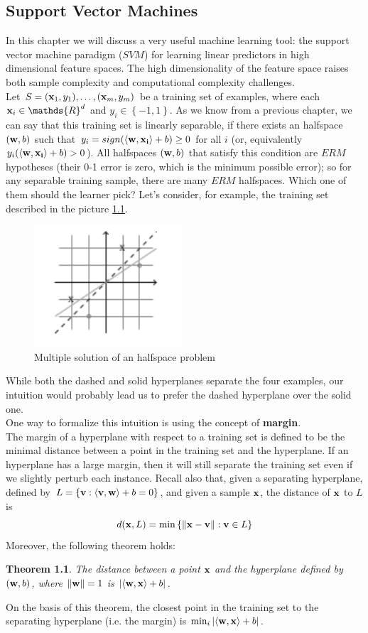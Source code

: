 \documentclass[12pt]{report}
\theoremstyle{plain}
\newtheorem{theorem}{Theorem}[chapter]
\newcommand\sprod[2]{\langle \vb{#1},\vb{#2}\rangle}
\begin{document}
\begin{flushleft}
\chapter{Support Vector Machines}
In this chapter we will discuss a very useful machine learning tool: the support vector machine paradigm ($SVM$) for learning linear predictors in high dimensional feature spaces. The high dimensionality of the feature space raises both sample complexity and computational complexity challenges.\\
Let $S=(\vb{x}_1,y_1),\dots,(\vb{x}_m,y_m)$ be a training set of examples, where each $\vb{x}_i\in\mathds{R}^d$ and $y_i\in\left\{-1,1\right\}$. As we know from a previous chapter, we can say that this training set is linearly separable, if there exists an halfspace $(\vb{w},b)$ such that $y_i = sign(\sprod{w}{x_i}+b)\geq 0$ for all $i$ (or, equivalently $y_i(\sprod{w}{x_i}+b)>0$). All halfspaces $(\vb{w},b)$ that satisfy this condition are $ERM$ hypotheses (their 0-1 error is zero, which is the minimum possible error); so for any separable training sample, there are many $ERM$ halfspaces. Which one of them should the learner pick?
Let's consider, for example, the training set described in the picture \ref{fig:ex_margin}.\\
\begin{figure}[!h]
	\centering
	\includegraphics[scale=1]{images/ex_margin.pdf}
	\caption{Multiple solution of an halfspace problem}
	\label{fig:ex_margin}
\end{figure}
While both the dashed and solid hyperplanes separate the four examples, our intuition would probably lead us to prefer the dashed hyperplane over the solid one.\\
One way to formalize this intuition is using the concept of \textbf{margin}.\\
The margin of a hyperplane with respect to a training set is defined to be the minimal distance between a point in the training set and the hyperplane. If an hyperplane has a large margin, then it will still separate the training set even if we slightly perturb each instance. Recall also that, given a separating hyperplane, defined by $L=\left\{\vb{v}:\sprod{v}{w}+b=0\right\}$, and given a sample $\vb{x}$, the distance of $\vb{x}$ to $L$ is
\[ d(\vb{x},L)=\min\left\{\norm{\vb{x}-\vb{v}}:\vb{v}\in L \right\} \]
Moreover, the following theorem holds:
\begin{theorem}
	The distance between a point $\vb{x}$ and the hyperplane defined by $(\vb{w},b)$, 	where $\norm{\vb{w}}=1$ is $\abs{\sprod{w}{x}+ b}$.
\end{theorem}
On the basis of this theorem, the closest point in the training set to the separating hyperplane (i.e. the margin) is $\min_i\abs{\sprod{w}{x}+ b}$.


\end{flushleft}
\end{document}
